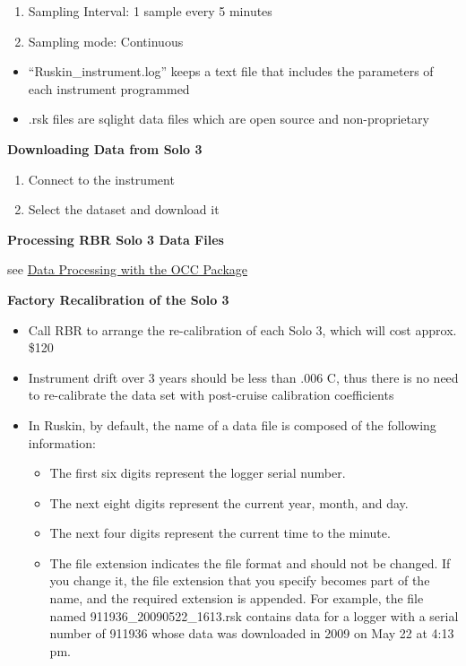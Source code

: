 \documentclass[]{book}
\providecommand{\tightlist}{%
  \setlength{\itemsep}{0pt}\setlength{\parskip}{0pt}}
\begin{document}
\begin{enumerate}
\def\labelenumi{\alph{enumi}.}
\item
  Sampling Interval: 1 sample every 5 minutes
\item
  Sampling mode: Continuous
\end{enumerate}

\begin{itemize}
\item
  ``Ruskin\_instrument.log'' keeps a text file that includes the parameters of each instrument programmed
\item
  .rsk files are sqlight data files which are open source and non-proprietary
\end{itemize}

\textbf{Downloading Data from Solo 3}

\begin{enumerate}
\def\labelenumi{\arabic{enumi}.}
\item
  Connect to the instrument
\item
  Select the dataset and download it
\end{enumerate}

\textbf{Processing RBR Solo 3 Data Files}

see \protect\hyperlink{data_processing}{Data Processing with the OCC Package}

\textbf{Factory Recalibration of the Solo 3}

\begin{itemize}
\item
  Call RBR to arrange the re-calibration of each Solo 3, which will cost approx. \$120
\item
  Instrument drift over 3 years should be less than .006 C, thus there is no need to re-calibrate the data set with post-cruise calibration coefficients
\item
  In Ruskin, by default, the name of a data file is composed of the following information:

  \begin{itemize}
  \tightlist
  \item
    The first six digits represent the logger serial number.
  \item
    The next eight digits represent the current year, month, and day.
  \item
    The next four digits represent the current time to the minute.
  \item
    The file extension indicates the file format and should not be changed. If you change it, the file extension that you specify becomes part of the name, and the required extension is appended. For example, the file named 911936\_20090522\_1613.rsk contains data for a logger with a serial number of 911936 whose data was downloaded in 2009 on May 22 at 4:13 pm.
  \end{itemize}
\end{itemize}
\end{document}
